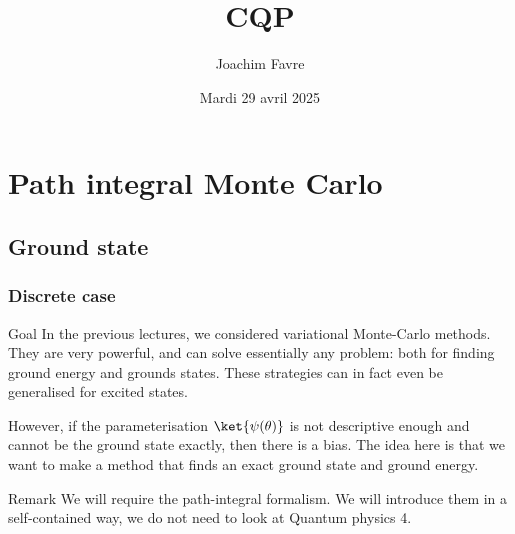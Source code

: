 \documentclass[a4paper]{article}
\title{CQP}
\author{Joachim Favre}
\date{Mardi 29 avril 2025}
\begin{document}
\maketitle


\section{Path integral Monte Carlo}
\subsection{Ground state}
\subsubsection{Discrete case}

\begin{parag}{Goal}
    In the previous lectures, we considered variational Monte-Carlo methods. They are very powerful, and can solve essentially any problem: both for finding ground energy and grounds states. These strategies can in fact even be generalised for excited states. 

    However, if the parameterisation $\ket{\psi\left(\theta\right)}$ is not descriptive enough and cannot be the ground state exactly, then there is a bias. The idea here is that we want to make a method that finds an exact ground state and ground energy.

    \begin{subparag}{Remark}
        We will require the path-integral formalism. We will introduce them in a self-contained way, we do not need to look at Quantum physics 4.
    \end{subparag}
\end{parag}
\end{document}
